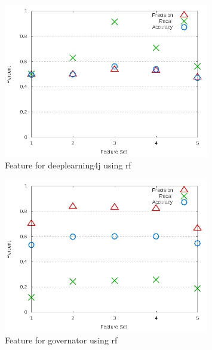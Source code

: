 \begin{figure}[!t]
\centering
\includegraphics[width=0.8\textwidth]{images/rf/test_3/deeplearning4j_sample_range.png}
\caption{Feature for deeplearning4j using \gls{rf}}
\label{fig:test_3_deeplearning4j_rf}
\end{figure}

\begin{figure}[!t]
\centering
\includegraphics[width=0.8\textwidth]{images/rf/test_3/governator_sample_range.png}
\caption{Feature for governator using \gls{rf}}
\label{fig:test_3_governator_rf}
\end{figure}

